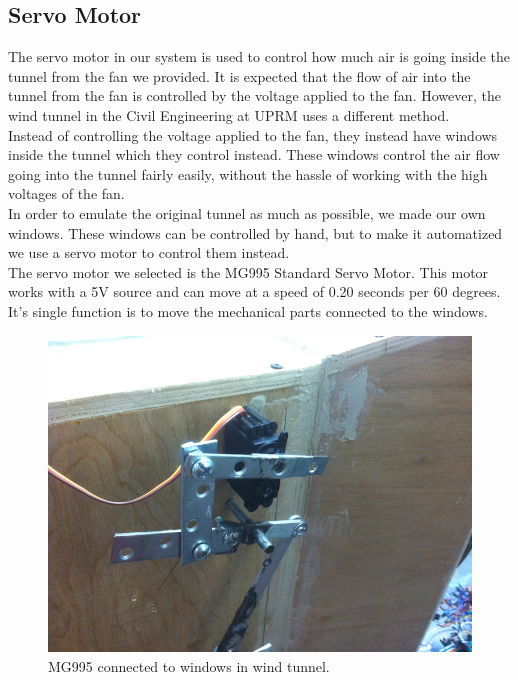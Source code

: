 		\subsection{Servo Motor}
		
		The servo motor in our system is used to control how much air is going inside the tunnel from the fan we provided. It is expected that the flow of air into the tunnel from the fan is controlled by the voltage applied to the fan. However, the wind tunnel in the Civil Engineering at UPRM uses a different method. \\
		Instead of controlling the voltage applied to the fan, they instead have windows inside the tunnel which they control instead. These windows control the air flow going into the tunnel fairly easily, without the hassle of working with the high voltages of the fan. \\
		In order to emulate the original tunnel as much as possible, we made our own windows. These windows can be controlled by hand, but to make it automatized we use a servo motor to control them instead. \\
		The servo motor we selected is the MG995 Standard Servo Motor. This motor works with a 5V source and can move at a speed of 0.20 seconds per 60 degrees. It's single function is to move the mechanical parts connected to the windows. 
		
		\begin{figure}[H]
			\centering
				\includegraphics[scale=0.1]{img/servoMotor}
			\caption{MG995 connected to windows in wind tunnel.}
		\end{figure}
		
